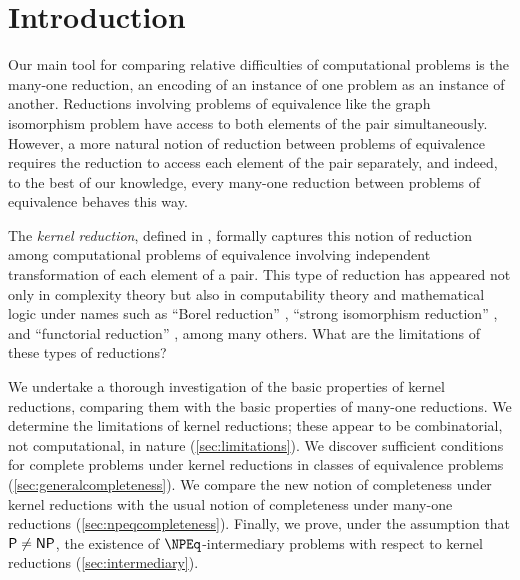 \section{Introduction}
%
Our main tool for comparing relative difficulties of computational problems is the many-one reduction, an encoding of an instance of one problem as an instance of another.
Reductions involving problems of equivalence like the graph isomorphism problem have access to both elements of the pair simultaneously.
However, a more natural notion of reduction between problems of equivalence requires the reduction to access each element of the pair separately, and indeed, to the best of our knowledge, every many-one reduction between problems of equivalence behaves this way.

The \emph{kernel reduction}, defined in \autocite[Definition~4.13]{fg11}, formally captures this notion of reduction among computational problems of equivalence involving independent transformation of each element of a pair.
This type of reduction has appeared not only in complexity theory but also in computability theory and mathematical logic under names such as ``Borel reduction'' \autocite{fs89}, ``strong isomorphism reduction'' \autocite{bcffm}, and ``functorial reduction'' \autocite{babai14, babai77, kucera76, zkt85}, among many others.
What are the limitations of these types of reductions?

We undertake a thorough investigation of the basic properties of kernel reductions, comparing them with the basic properties of many-one reductions.
We determine the limitations of kernel reductions; these appear to be combinatorial, not computational, in nature (\autoref{sec:limitations}).
We discover sufficient conditions for complete problems under kernel reductions in classes of equivalence problems (\autoref{sec:generalcompleteness}).
We compare the new notion of completeness under kernel reductions with the usual notion of completeness under many-one reductions (\autoref{sec:npeqcompleteness}).
Finally, we prove, under the assumption that ${\mathsf{P}} \neq {\ensuremath{\mathsf{NP}}}$, the existence of $\NPEq$-intermediary problems with respect to kernel reductions (\autoref{sec:intermediary}).

